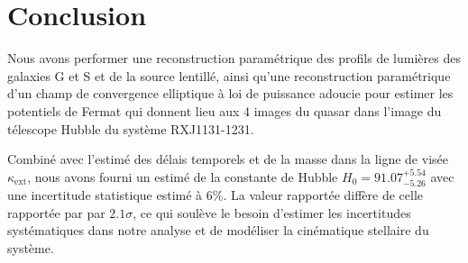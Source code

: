 \documentclass[times,10pt,twocolumn]{article}
\begin{document}
\section{Conclusion}\label{sec:conclusion}
Nous avons performer une reconstruction paramétrique des profils de lumières 
des galaxies G et S et de la source lentillé, ainsi qu'une reconstruction paramétrique 
d'un champ de convergence elliptique à loi de puissance adoucie pour estimer les 
potentiels de Fermat qui donnent lieu aux 4 images du quasar dans l'image du télescope 
Hubble du système RXJ1131-1231.

Combiné avec l'estimé des délais temporels et de la masse dans la ligne de visée 
$\kappa_{\mathrm{ext}}$, nous avons fourni un estimé de la constante de Hubble 
$H_0 = 91.07^{+5.54}_{-5.26}$ avec une incertitude statistique estimé à 6\%. 
La valeur rapportée diffère de celle rapportée par \citet{Suyu2013} par $2.1\sigma$, 
ce qui soulève le besoin d'estimer les incertitudes systématiques dans notre analyse 
et de modéliser la cinématique stellaire du système.


\printbibliography
\end{document}

